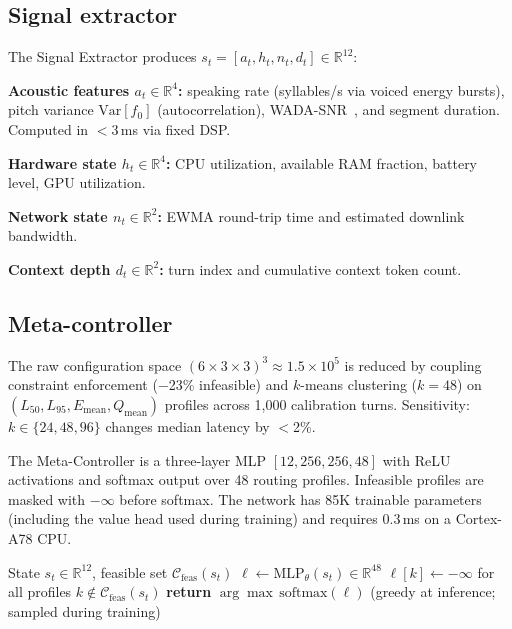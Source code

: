 \documentclass{article}
\begin{document}
\subsection{Signal extractor}
\label{sec:signal}

The Signal Extractor produces $s_t=[a_t,h_t,n_t,d_t]\in\mathbb{R}^{12}$:

\textbf{Acoustic features $a_t\in\mathbb{R}^4$:} speaking rate (syllables/s via voiced energy bursts), pitch variance $\text{Var}[f_0]$ (autocorrelation), WADA-SNR~\citep{kim2008wadasnr}, and segment duration. Computed in $<$3\,ms via fixed DSP.

\textbf{Hardware state $h_t\in\mathbb{R}^4$:} CPU utilization, available RAM fraction, battery level, GPU utilization.

\textbf{Network state $n_t\in\mathbb{R}^2$:} EWMA round-trip time and estimated downlink bandwidth.

\textbf{Context depth $d_t\in\mathbb{R}^2$:} turn index and cumulative context token count.

\subsection{Meta-controller}
\label{sec:mc}

The raw configuration space $(6\times3\times3)^3\approx1.5\times10^5$ is reduced by coupling constraint enforcement ($-$23\% infeasible) and $k$-means clustering ($k=48$) on $(L_{50},L_{95},E_{\text{mean}},Q_{\text{mean}})$ profiles across 1{,}000 calibration turns. Sensitivity: $k\in\{24,48,96\}$ changes median latency by $<$2\%.

The Meta-Controller is a three-layer MLP $[12,256,256,48]$ with ReLU activations and softmax output over 48 routing profiles. Infeasible profiles are masked with $-\infty$ before softmax. The network has 85K trainable parameters (including the value head used during training) and requires 0.3\,ms on a Cortex-A78 CPU.

\begin{algorithm}[t]
\caption{Meta-Controller Inference}
\label{alg:mc}
\begin{algorithmic}[1]
\Require State $s_t\in\mathbb{R}^{12}$, feasible set $\mathcal{C}_{\text{feas}}(s_t)$
\State $\ell\leftarrow\text{MLP}_\theta(s_t)\in\mathbb{R}^{48}$
\State $\ell[k]\leftarrow-\infty$ for all profiles $k\notin\mathcal{C}_{\text{feas}}(s_t)$
\State \textbf{return} $\arg\max\,\text{softmax}(\ell)$ \hfill (greedy at inference; sampled during training)
\end{algorithmic}
\end{algorithm}
\end{document}

